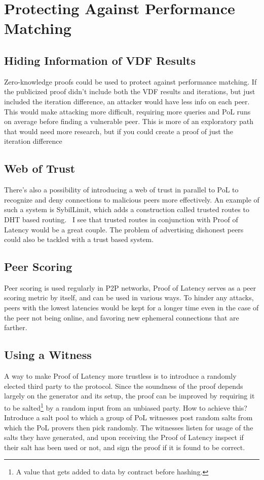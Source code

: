 \section{Protecting Against Performance Matching}
\subsection{Hiding Information of VDF Results}
Zero-knowledge proofs could be used to protect against performance matching. If the publicized proof didn't include both the VDF results and iterations, but just included the iteration difference, an attacker would have less info on each peer. This would make attacking more difficult, requiring more queries and PoL runs on average before finding a vulnerable peer. This is more of an exploratory path that would need more research, but if you could create a proof of just the iteration difference

\subsection{Web of Trust}
There's also a possibility of introducing a web of trust in parallel to PoL to recognize and deny connections to malicious peers more effectively. An example of such a system is SybilLimit, which adds a construction called trusted routes to DHT based routing.~\cite{Yu2008-xl} I see that trusted routes in conjunction with Proof of Latency would be a great couple. The problem of advertising dishonest peers could also be tackled with a trust based system.
~
\subsection{Peer Scoring}
Peer scoring is used regularly in P2P networks,
Proof of Latency serves as a peer scoring metric by itself, and can be used in various ways. To hinder any attacks, peers with the lowest latencies would be kept for a longer time even in the case of the peer not being online, and favoring new ephemeral connections that are farther.

\subsection{Using a Witness}
A way to make Proof of Latency more trustless is to introduce a randomly elected third party to the protocol. Since the soundness of the proof depends largely on the generator and its setup, the proof can be improved by requiring it to be salted\footnote{A value that gets added to data by contract before hashing.} by a random input from an unbiased party. How to achieve this? Introduce a salt pool to which a group of PoL witnesses post random salts from which the PoL provers then pick randomly. The witnesses listen for usage of the salts they have generated, and upon receiving the Proof of Latency inspect if their salt has been used or not, and sign the proof if it is found to be correct.


